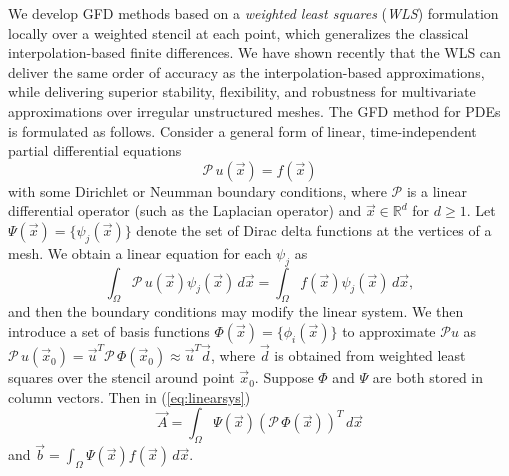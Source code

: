 \documentclass{report}
\begin{document}
We develop GFD methods based on a \emph{weighted least squares} (\emph{WLS})
formulation locally over a weighted stencil at each point, which generalizes
the classical interpolation-based finite differences. We have shown
recently that the WLS can deliver the same order of accuracy as the
interpolation-based approximations, while delivering superior stability,
flexibility, and robustness for multivariate approximations over irregular
unstructured meshes. The GFD method for PDEs is formulated as follows.
Consider a general form of linear, time-independent partial differential
equations
\begin{equation}
\mathcal{P}\, u(\vec{x})=f(\vec{x})\label{eq:linearPDE}
\end{equation}
with some Dirichlet or Neumman boundary conditions, where $\mathcal{P}$
is a linear differential operator (such as the Laplacian operator)
and $\vec{x}\in\mathbb{R}^{d}$ for $d\ge1$. Let $\Psi(\vec{x})=\{\psi_{j}(\vec{x})\}$
denote the set of Dirac delta functions at the vertices of a mesh.
We obtain a linear equation for each $\psi_{j}$ as
\begin{equation}
\int_{\Omega}\mathcal{P}\, u(\vec{x})\psi_{j}(\vec{x})\,
d\vec{x}=\int_{\Omega}f(\vec{x})\psi_{j}(\vec{x})\,
d\vec{x},\label{eq:weak_form}
\end{equation}
and then the boundary conditions may modify the linear system. We
then introduce a set of basis functions $\Phi(\vec{x})=\{\phi_{i}(\vec{x})\}$
to approximate $\mathcal{P}u$ as $\mathcal{P}\,
u(\vec{x}_{0})=\vec{u}^{T}\mathcal{P}\,\Phi(\vec{x}_{0})\approx\vec{u}^{T}\vec{d}$,
where $\vec{d}$ is obtained from weighted least squares over the
stencil around point $\vec{x}_{0}$. Suppose $\Phi$ and $\Psi$ are
both stored in column vectors. Then in (\ref{eq:linearsys})
\begin{equation}
\vec{A}=\int_{\Omega}\Psi(\vec{x})\left(\mathcal{P}\,\Phi(\vec{x})\right)^{T}\,
d\vec{x}\label{eq:coeff_mat}
\end{equation}
and $\vec{b}=\int_{\Omega}\Psi(\vec{x})f(\vec{x})\, d\vec{x}$.
\end{document}
